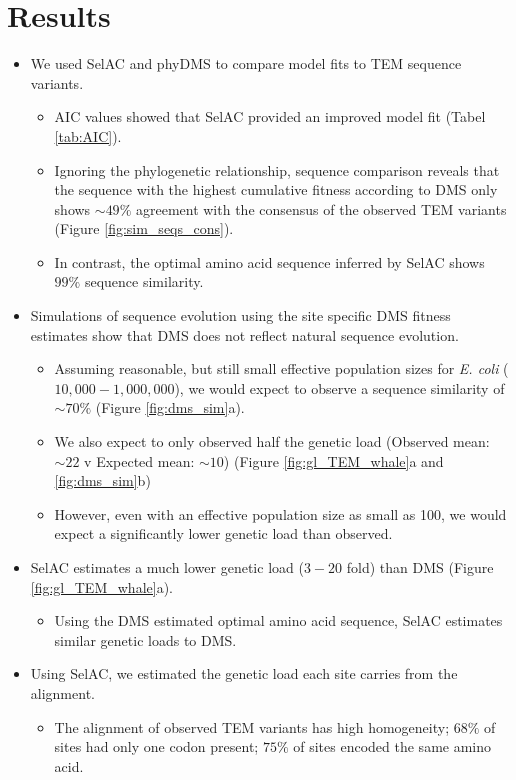 \documentclass[12pt]{article}
\begin{document}
\section*{Results}
\begin{itemize}
	\item We used SelAC and phyDMS to compare model fits to TEM sequence variants.
	\begin{itemize}
		\item AIC values showed that SelAC provided an improved model fit (Tabel \ref{tab:AIC}).
		\item Ignoring the phylogenetic relationship, sequence comparison reveals that the sequence with the highest cumulative fitness according to DMS only shows $\sim49 \%$ agreement with the consensus of the observed TEM variants (Figure \ref{fig:sim_seqs_cons}).
		\item In contrast, the optimal amino acid sequence inferred by SelAC shows $99\%$ sequence similarity.
	\end{itemize}
	\item Simulations of sequence evolution using the site specific DMS fitness estimates show that DMS does not reflect natural sequence evolution.
	\begin{itemize}
		\item Assuming reasonable, but still small effective population sizes for \textit{E. coli} ($10,000 - 1,000,000$), we would expect to observe a sequence similarity of $\sim 70 \%$ (Figure \ref{fig:dms_sim}a).
		\item We also expect to only observed half the genetic load (Observed mean: $\sim 22$ v Expected mean: $\sim 10$) (Figure \ref{fig:gl_TEM_whale}a and \ref{fig:dms_sim}b)
		\item However, even with an effective population size as small as 100, we would expect a significantly lower genetic load than observed.
	\end{itemize}
	\item SelAC estimates a much lower genetic load ($3 - 20$ fold) than DMS (Figure \ref{fig:gl_TEM_whale}a).
	\begin{itemize}
		\item Using the DMS estimated optimal amino acid sequence, SelAC estimates similar genetic loads to DMS.
	\end{itemize}
	\item Using SelAC, we estimated the genetic load each site carries from the alignment.
	\begin{itemize}
		\item The alignment of observed TEM variants has high homogeneity; $68 \%$ of sites had only one codon present; $75 \%$ of sites encoded the same amino acid.

\end{itemize}
\end{itemize}
\end{document}
